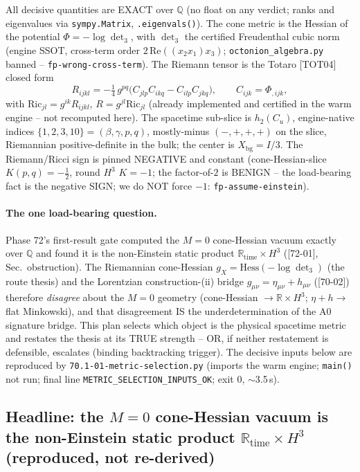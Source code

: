 All decisive quantities are EXACT over $\mathbb{Q}$ (no float on any verdict; ranks and
eigenvalues via \texttt{sympy.Matrix}, \texttt{.eigenvals()}). The cone metric is the
Hessian of the potential $\Phi=-\log\det_3$, with $\det_3$ the certified Freudenthal
cubic norm (engine SSOT, cross-term order $2\,\mathrm{Re}((x_2 x_1)x_3)$;
\texttt{octonion\_algebra.py} banned -- \texttt{fp-wrong-cross-term}). The Riemann
tensor is the Totaro [TOT04] closed form
\begin{equation}
  R_{ijkl} = -\tfrac14\, g^{pq}\big(C_{jlp}C_{ikq}-C_{ilp}C_{jkq}\big),
  \qquad C_{ijk}=\Phi_{,ijk},
  \label{eq701:totaro}
\end{equation}
with $\mathrm{Ric}_{jl}=g^{ik}R_{ijkl}$, $R=g^{jl}\mathrm{Ric}_{jl}$ (already implemented
and certified in the warm engine -- not recomputed here). The spacetime sub-slice is
$h_2(C_u)$, engine-native indices $\{1,2,3,10\}=(\beta,\gamma,p,q)$, mostly-minus
$(-,+,+,+)$ on the slice, Riemannian positive-definite in the bulk; the center is
$X_{\mathrm{bg}}=I/3$. The Riemann/Ricci sign is pinned NEGATIVE and constant
(cone-Hessian-slice $K(p,q)=-\tfrac12$, round $H^3$ $K=-1$; the factor-of-$2$ is BENIGN
-- the load-bearing fact is the negative SIGN; we do NOT force $-1$:
\texttt{fp-assume-einstein}).

\paragraph{The one load-bearing question.} Phase 72's first-result gate computed the
$M=0$ cone-Hessian vacuum exactly over $\mathbb{Q}$ and found it is the non-Einstein
static product $\mathbb{R}_{\text{time}}\times H^3$ ([72-01], Sec.~obstruction). The
Riemannian cone-Hessian $g_X=\mathrm{Hess}(-\log\det_3)$ (the route thesis) and the
Lorentzian construction-(ii) bridge $g_{\mu\nu}=\eta_{\mu\nu}+h_{\mu\nu}$ ([70-02])
therefore \emph{disagree} about the $M=0$ geometry (cone-Hessian $\to
\mathbb{R}\times H^3$; $\eta+h\to$ flat Minkowski), and that disagreement IS the
underdetermination of the A0 signature bridge. This plan selects which object is the
physical spacetime metric and restates the thesis at its TRUE strength -- OR, if neither
restatement is defensible, escalates (binding backtracking trigger). The decisive inputs
below are reproduced by \texttt{70.1-01-metric-selection.py} (imports the warm engine;
\texttt{main()} not run; final line \texttt{METRIC\_SELECTION\_INPUTS\_OK}; exit $0$,
$\sim$3.5\,s).

\subsection{Headline: the $M=0$ cone-Hessian vacuum is the non-Einstein static
            product $\mathbb{R}_{\text{time}}\times H^3$ (reproduced, not re-derived)}
\label{sec701:headline}

